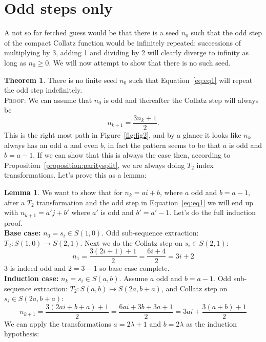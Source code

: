 \documentclass{article}
\theoremstyle{definition}
\newtheorem{theorem}{Theorem}[section]
\newtheorem{lemma}{Lemma}[section]
\begin{document}
\section{Odd steps only}
A not so far fetched guess would be that there is a seed $n_0$ such that the odd step of the compact Collatz function would be infinitely repeated: successions of multiplying by 3, adding 1 and dividing by 2 will clearly diverge to infinity as long as $n_0\geq0$. We will now attempt to show that there is no such seed.
%
\begin{theorem}\label{theorem:thm1}
There is no finite seed $n_0$ such that Equation~\ref{eq:eq1} will repeat the odd step indefinitely.
%
\\[.2cm]
%
\textsc{Proof:} We can assume that $n_0$ is odd and thereafter the Collatz step will always be
\begin{equation*}
    n_{k+1} = \frac{3n_k + 1}{2}.
\end{equation*}
This is the right most path in Figure~\ref{fig:fig2}, and by a glance it looks like $n_k$ always has an odd $a$ and even $b$, in fact the pattern seems to be that $a$ is odd and $b=a-1$. If we can show that this is always the case then, according to Proposition~\ref{proposition:paritysplit}, we are always doing $T_2$ index transformations. Let's prove this as a lemma:
%
\begin{lemma}
We want to show that for $n_k = ai+b$, where $a$ odd and $b=a-1$, after a $T_2$ transformation and the odd step in Equation~\ref{eq:eq1} we will end up with $n_{k+1}=a'j+b'$ where $a'$ is odd and $b'=a'-1$. Let's do the full induction proof.
%
\\[.2cm]
%
\textbf{Base case:} $n_0 = s_i \in S(1,0)$. Odd sub-sequence extraction: $T_2: S(1,0) \longrightarrow S(2,1)$. Next we do the Collatz step on $s_i\in S(2,1)$:
\begin{equation*}
    n_1 = \frac{3(2i+1)+1}{2} = \frac{6i+4}{2} = 3i+2
\end{equation*}
3 is indeed odd and $2=3-1$ so base case complete.
%
\\[.2cm]
%
\textbf{Induction case:} $n_k = s_i \in S(a,b)$. Assume $a$ odd and $b=a-1$. Odd sub-sequence extraction: $T_2: S(a,b) \longmapsto S(2a, b+a)$, and Collatz step on $s_i \in S(2a,b+a)$:
\begin{equation*}
    n_{k+1} = \frac{3(2ai+b+a)+1}{2} = \frac{6ai+3b+3a+1}{2} = 3ai + \frac{3(a+b)+1}{2}
\end{equation*}
We can apply the transformations $a=2\lambda+1$ and $b=2\lambda$ as the induction hypothesis:

\end{lemma}
\end{theorem}
\end{document}
